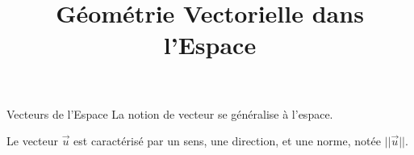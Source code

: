 \documentclass{cours}
\title{Géométrie Vectorielle dans l'Espace}
\begin{document}

    \begin{Gpartie}{Vecteurs de l'Espace} 
        La notion de vecteur se généralise à l'espace.

        Le vecteur $\vec{u}$ est caractérisé par un sens, une direction, et une norme, notée $\lvert\lvert{\vec{u}}\rvert\rvert$.
    \end{Gpartie}
\end{document}

